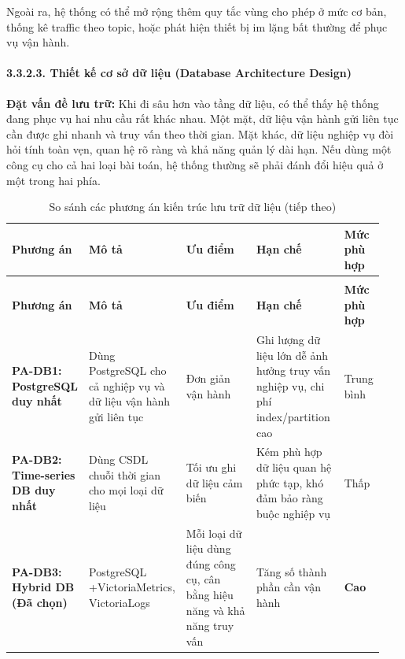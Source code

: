 \documentclass[a4paper]{extarticle}
\newcommand{\thesissettableid}[2]{%
  \renewcommand{\thetable}{#1}%
  \renewcommand{\theHtable}{#2}%
}
\begin{document}
Ngoài ra, hệ thống có thể mở rộng thêm quy tắc vùng cho phép ở mức cơ bản, thống
kê traffic theo topic, hoặc phát hiện thiết bị im lặng bất thường để
phục vụ vận hành.

\paragraph{3.3.2.3. Thiết kế cơ sở dữ liệu (Database Architecture
Design)}\label{3233-thiux1ebft-kux1ebf-cux1a1-sux1edf-dux1eef-liux1ec7u-database-architecture-design}

\textbf{Đặt vấn đề lưu trữ:} Khi đi sâu hơn vào tầng dữ liệu, có thể thấy
hệ thống đang phục vụ hai nhu cầu rất khác nhau. Một mặt, dữ liệu vận
hành gửi liên tục cần
được ghi nhanh và truy vấn theo thời gian. Mặt khác, dữ liệu nghiệp vụ
đòi hỏi tính toàn vẹn, quan hệ rõ ràng và khả năng quản lý dài hạn. Nếu
dùng một công cụ cho cả hai loại bài toán, hệ thống thường sẽ phải đánh
đổi hiệu quả ở một trong hai phía.


{\thesissettableid{3.18A}{tab-ch3-so-sanh-cac-phuong-an-kien-truc-luu-tru-du-lieu}
\def\LTcaptype{table}
\begin{longtable}{|L{0.149\linewidth}|L{0.233\linewidth}|L{0.236\linewidth}|L{0.241\linewidth}|L{0.085\linewidth}|}
\caption{So sánh các phương án kiến trúc lưu trữ dữ liệu}\label{tab:ch3-so-sanh-cac-phuong-an-kien-truc-luu-tru-du-lieu}\\
\hline \textbf{Phương án} & \textbf{Mô tả} & \textbf{Ưu điểm} & \textbf{Hạn chế} & \textbf{Mức phù hợp} \\
\hline
\endfirsthead
\caption[]{So sánh các phương án kiến trúc lưu trữ dữ liệu (tiếp theo)}\\
\hline \textbf{Phương án} & \textbf{Mô tả} & \textbf{Ưu điểm} & \textbf{Hạn chế} & \textbf{Mức phù hợp} \\
\hline
\endhead
\hline
\endfoot
\endlastfoot
\textbf{PA-DB1: PostgreSQL duy nhất} & Dùng PostgreSQL cho cả nghiệp vụ
và dữ liệu vận hành gửi liên tục & Đơn giản vận hành & Ghi lượng dữ liệu lớn dễ ảnh hưởng truy
vấn nghiệp vụ, chi phí index/partition cao & Trung bình \\\hline
\textbf{PA-DB2: Time-series DB duy nhất} & Dùng CSDL chuỗi thời gian cho
mọi loại dữ liệu & Tối ưu ghi dữ liệu cảm biến & Kém phù hợp dữ liệu
quan hệ phức tạp, khó đảm bảo ràng buộc nghiệp vụ & Thấp \\\hline
\textbf{PA-DB3: Hybrid DB (Đã chọn)} & PostgreSQL +\newline Victoria\-Metrics,\newline
Victoria\-Logs & Mỗi loại dữ liệu dùng đúng công cụ, cân bằng hiệu năng và
khả năng truy vấn & Tăng số thành phần cần vận hành & \textbf{Cao} \\\hline
\end{longtable}
}
\end{document}
